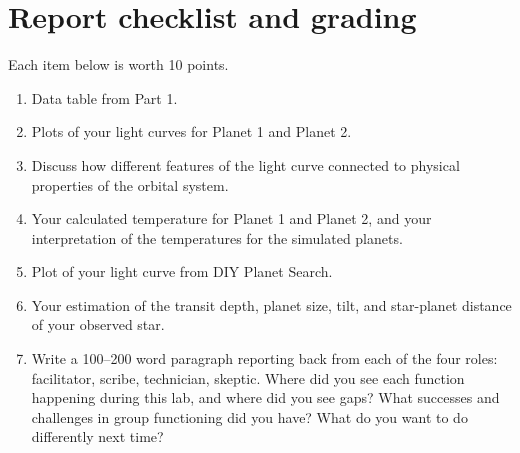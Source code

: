 \section{Report checklist and grading}

Each item below is worth 10 points.

\begin{enumerate}
	\item Data table from Part 1.
	
	\item Plots of your light curves for Planet 1 and Planet 2.
	
	\item Discuss how different features of the light curve connected to physical
	properties of the orbital system.
	
	\item Your calculated temperature for Planet 1 and Planet 2, and your interpretation of the
	temperatures for the simulated planets.
	
	\item Plot of your light curve from DIY Planet Search.
	
	\item Your estimation of the transit depth, planet size, tilt, and star-planet distance of your observed star.
	
	\item Write a 100--200 word paragraph reporting back from each of the four roles: facilitator, scribe, technician, skeptic. Where did you see each function happening during this lab, and where did you see gaps? What successes and challenges in group functioning did you have? What do you want to do differently next time?
\end{enumerate}
